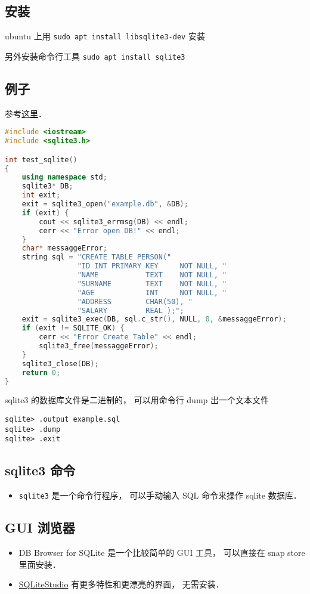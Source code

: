 
\begin{issues}
\issueDraft
\end{issues}


\subsection{安装}
ubuntu 上用 \verb|sudo apt install libsqlite3-dev| 安装

另外安装命令行工具 \verb|sudo apt install sqlite3|

\subsection{例子}
参考\href{https://www.tutorialspoint.com/sqlite/sqlite_c_cpp.htm}{这里}．
\begin{lstlisting}[language=cpp]
#include <iostream>
#include <sqlite3.h>

int test_sqlite()
{
	using namespace std;
    sqlite3* DB;
    int exit;
    exit = sqlite3_open("example.db", &DB);
    if (exit) {
		cout << sqlite3_errmsg(DB) << endl;
        cerr << "Error open DB!" << endl;
    }
	char* messaggeError;
	string sql = "CREATE TABLE PERSON("
                 "ID INT PRIMARY KEY     NOT NULL, "
                 "NAME           TEXT    NOT NULL, "
                 "SURNAME        TEXT    NOT NULL, "
                 "AGE            INT     NOT NULL, "
                 "ADDRESS        CHAR(50), "
                 "SALARY         REAL );";
	exit = sqlite3_exec(DB, sql.c_str(), NULL, 0, &messaggeError);
    if (exit != SQLITE_OK) {
        cerr << "Error Create Table" << endl;
        sqlite3_free(messaggeError);
    }
    sqlite3_close(DB);
    return 0;
}
\end{lstlisting}

sqlite3 的数据库文件是二进制的， 可以用命令行 dump 出一个文本文件
\begin{lstlisting}
sqlite> .output example.sql
sqlite> .dump
sqlite> .exit
\end{lstlisting}

\subsection{sqlite3 命令}
\begin{itemize}
\item \verb|sqlite3| 是一个命令行程序， 可以手动输入 SQL 命令来操作 sqlite 数据库．
\end{itemize}

\subsection{GUI 浏览器}
\begin{itemize}
\item DB Browser for SQLite 是一个比较简单的 GUI 工具， 可以直接在 snap store 里面安装．
\item \href{https://sqlitestudio.pl/}{SQLiteStudio} 有更多特性和更漂亮的界面， 无需安装．
\end{itemize}
